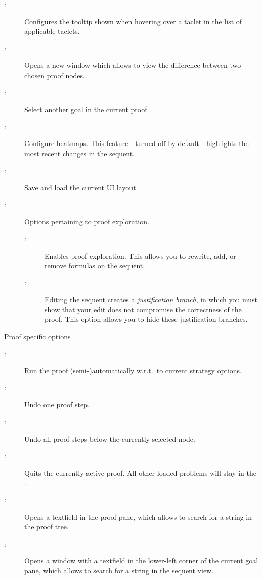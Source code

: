 \begin{description}
\begin{description}
  \item[:] Configures the tooltip shown when
    hovering over a taclet in the list of applicable taclets.
  \item[:] Opens a new window which allows 
  to view the  difference between two chosen proof nodes.
  
  \item[:] Select another goal in the current proof.
  \item[:] Configure heatmaps. This feature---turned off by default---highlights the most recent changes in the sequent.
  \item[:] Save and load the current UI layout.
  \item[:] Options pertaining to proof exploration.
  \begin{description}
  	\item[:] Enables proof exploration. This allows you to rewrite, add, or remove formulas on the sequent.
  	\item[:] Editing the sequent creates a {\em justification branch}, in which you must show that your edit does not compromise the correctness of the proof. This option allows you to hide these justification branches.
  \end{description}
  

  \end{description}

\item[\mea{Proof}] Proof specific options
  \begin{description}
  \item[:] Run the proof (semi-)automatically w.r.t.\ 
	to current strategy options.

  \item[:] Undo one proof step.
  \item[\meb{}{Prune proof}:] Undo all proof steps below the currently selected node.

  \item[:] Quits the currently active
    proof. All other loaded problems will stay in the \kp.
  \item[:] Opens a textfield in the proof pane, which allows to 
  search for a string in the proof tree.
  \item[:] Opens a window with a textfield in the lower-left 
  corner of the current goal pane, which allows to search for a string in the sequent view.
  

\end{description}
\end{description}
